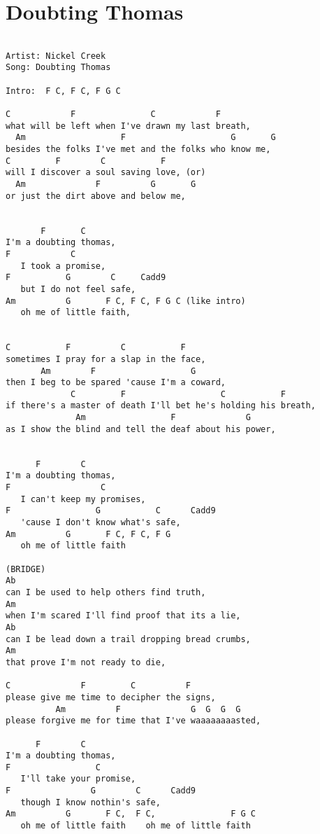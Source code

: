 \documentclass[leqno]{memoir}
\begin{document}
\chapter{Doubting Thomas}
\begin{verbatim}

Artist: Nickel Creek
Song: Doubting Thomas

Intro:  F C, F C, F G C

C            F               C            F 
what will be left when I've drawn my last breath,
  Am                   F                     G       G
besides the folks I've met and the folks who know me,
C         F        C           F 
will I discover a soul saving love, (or)
  Am              F          G       G
or just the dirt above and below me,


       F       C 
I'm a doubting thomas,
F            C 
   I took a promise,
F           G        C     Cadd9
   but I do not feel safe,
Am          G       F C, F C, F G C (like intro) 
   oh me of little faith,


C           F          C           F
sometimes I pray for a slap in the face,
       Am        F                   G 
then I beg to be spared 'cause I'm a coward,
             C         F                   C           F
if there's a master of death I'll bet he's holding his breath,
              Am                 F              G
as I show the blind and tell the deaf about his power,


      F        C
I'm a doubting thomas,
F                  C
   I can't keep my promises,
F                 G           C      Cadd9
   'cause I don't know what's safe,
Am          G       F C, F C, F G 
   oh me of little faith

(BRIDGE)
Ab
can I be used to help others find truth,
Am
when I'm scared I'll find proof that its a lie,
Ab
can I be lead down a trail dropping bread crumbs,
Am
that prove I'm not ready to die,

C              F         C          F
please give me time to decipher the signs,
          Am          F              G  G  G  G
please forgive me for time that I've waaaaaaaasted,

      F        C
I'm a doubting thomas,
F                 C
   I'll take your promise,
F                G        C      Cadd9
   though I know nothin's safe,
Am          G       F C,  F C,               F G C 
   oh me of little faith    oh me of little faith

\end{verbatim}
\newpage
\end{document}
